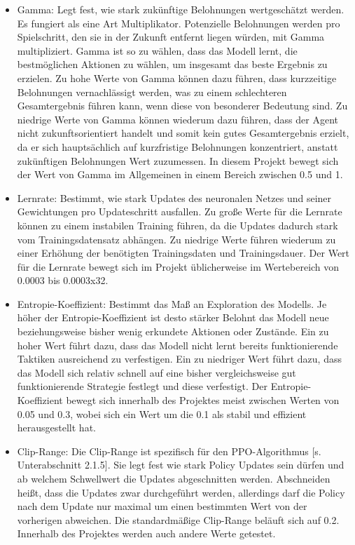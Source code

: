 \begin{itemize} 
\item Gamma: Legt fest, wie stark zukünftige Belohnungen wertgeschätzt werden. Es fungiert als eine Art Multiplikator. Potenzielle Belohnungen werden pro Spielschritt, den sie in der Zukunft entfernt liegen würden, mit Gamma multipliziert. Gamma ist so zu wählen, dass das Modell lernt, die bestmöglichen Aktionen zu wählen, um insgesamt das beste Ergebnis zu erzielen. Zu hohe Werte von Gamma können dazu führen, dass kurzzeitige Belohnungen vernachlässigt werden, was zu einem schlechteren Gesamtergebnis führen kann, wenn diese von besonderer Bedeutung sind. Zu niedrige Werte von Gamma können wiederum dazu führen, dass der Agent nicht zukunftsorientiert handelt und somit kein gutes Gesamtergebnis erzielt, da er sich hauptsächlich auf kurzfristige Belohnungen konzentriert, anstatt zukünftigen Belohnungen Wert zuzumessen. In diesem Projekt bewegt sich der Wert von Gamma im Allgemeinen in einem Bereich zwischen 0.5 und 1.

\item Lernrate: Bestimmt, wie stark Updates des neuronalen Netzes und seiner Gewichtungen pro Updateschritt ausfallen. Zu große Werte für die Lernrate können zu einem instabilen Training führen, da die Updates dadurch stark vom Trainingsdatensatz abhängen. Zu niedrige Werte führen wiederum zu einer Erhöhung der benötigten Trainingsdaten und Trainingsdauer. Der Wert für die Lernrate bewegt sich im Projekt üblicherweise im Wertebereich von 0.0003 bis 0.0003x32.

\item Entropie-Koeffizient: Bestimmt das Maß an Exploration des Modells. Je höher der Entropie-Koeffizient ist desto stärker Belohnt das Modell neue beziehungsweise bisher wenig erkundete Aktionen oder Zustände. Ein zu hoher Wert führt dazu, dass das Modell nicht lernt bereits funktionierende Taktiken ausreichend zu verfestigen. Ein zu niedriger Wert führt dazu, dass das Modell sich relativ schnell auf eine bisher vergleichsweise gut funktionierende Strategie festlegt und diese verfestigt. Der Entropie-Koeffizient bewegt sich innerhalb des Projektes meist zwischen Werten von 0.05 und 0.3, wobei sich ein Wert um die 0.1 als stabil und effizient herausgestellt hat.

\item Clip-Range: Die Clip-Range ist spezifisch für den PPO-Algorithmus [s. Unterabschnitt 2.1.5]. Sie legt fest wie stark Policy Updates sein dürfen und ab welchem Schwellwert die Updates abgeschnitten werden. Abschneiden heißt, dass die Updates zwar durchgeführt werden, allerdings darf die Policy nach dem Update nur maximal um einen bestimmten Wert von der vorherigen abweichen. Die standardmäßige Clip-Range beläuft sich auf 0.2. Innerhalb des Projektes werden auch andere Werte getestet.


\end{itemize}
